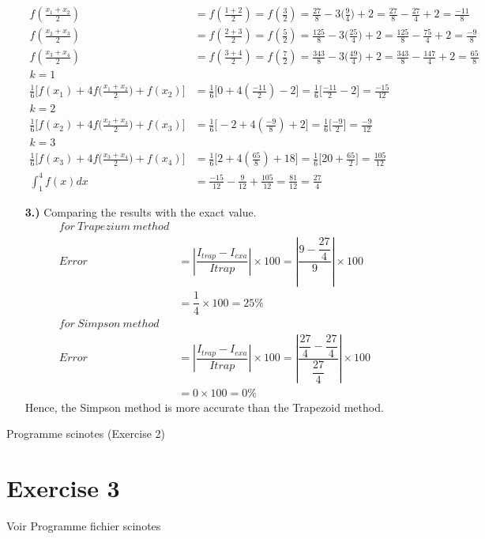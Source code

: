 \documentclass[a4paper,12pt]{article}
\begin{document}
\begin{itemize}
\begin{align*}
f(\frac{x_1+x_2}{2})&=f(\frac{1+2}{2})=f(\frac{3}{2})=\frac{27}{8}-3\big(\frac{9}{4}\big)+2=\frac{27}{8}-\frac{27}{4}+2=\frac{-11}{8}\\
f(\frac{x_2+x_3}{2})&=f(\frac{2+3}{2})=f(\frac{5}{2})=\frac{125}{8}-3\big(\frac{25}{4}\big)+2=\frac{125}{8}-\frac{75}{4}+2=\frac{-9}{8}\\
f(\frac{x_3+x_4}{2})&=f(\frac{3+4}{2})=f(\frac{7}{2})=\frac{343}{8}-3\big(\frac{49}{4}\big)+2=\frac{343}{8}-\frac{147}{4}+2=\frac{65}{8}\\
k=1\\
\frac{1}{6} \big[ f(x_1)+4f \big(\frac{x_1+x_2}{2}\big)+f(x_2)\big]&=\frac{1}{6}\big[ 0+4(\frac{-11}{2})-2\big]=\frac{1}{6}\big[\frac{-11}{2}-2 \big]=\frac{-15}{12}\\
k=2\\
\frac{1}{6} \big[ f(x_2)+4f \big(\frac{x_2+x_3}{2}\big)+f(x_3)\big]&=\frac{1}{6}\big[ -2+4(\frac{-9}{8})+2\big]=\frac{1}{6}\big[\frac{-9}{2} \big]=\frac{-9}{12}\\
k=3\\
\frac{1}{6} \big[ f(x_3)+4f \big(\frac{x_3+x_4}{2}\big)+f(x_4)\big]&=\frac{1}{6}\big[ 2+4(\frac{65}{8})+18\big]=\frac{1}{6}\big[20+\frac{65}{2} \big]=\frac{105}{12}\\
\int^4_1 f(x)dx&=\frac{-15}{12}-\frac{9}{12}+\frac{105}{12}=\frac{81}{12}=\frac{27}{4}
\end{align*}

\item[\textbf{3.)}] Comparing the results with the exact value.\\
\begin{align*}
for \ Trapezium \ method\\
Error &= \left| \dfrac{I_{trap} - I_{exa}}{Itrap}\right|\times100 = \left|\dfrac{9 - \dfrac{27}{4}}{9}\right|\times 100\\
 &= \dfrac{1}{4}\times 100 = 25\%\\
for \ Simpson \ method\\
Error &= \left| \dfrac{I_{trap} - I_{exa}}{Itrap}\right|\times100 = \left|\dfrac{\dfrac{27}{4} - \dfrac{27}{4}}{\dfrac{27}{4}}\right|\times 100\\
 &= 0 \times 100 = 0\%
\end{align*}
Hence, the Simpson method is more accurate than the Trapezoid method.
\end{itemize}
Programme scinotes (Exercise 2)

\section{Exercise 3}
Voir Programme fichier scinotes
\end{document}
